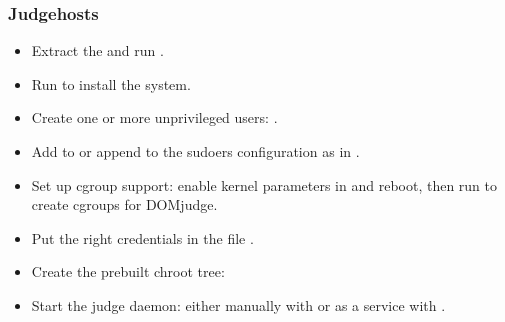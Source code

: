 \documentclass[a4paper,10pt,english,openany]{sphinxmanual}
\begin{document}
\subsubsection{Judgehosts}
\label{\detokenize{quick-install:judgehosts}}\begin{itemize}
\item {} 
\sphinxAtStartPar
Extract the  and run
.

\item {} 
\sphinxAtStartPar
Run  to install the system.

\item {} 
\sphinxAtStartPar
Create one or more unprivileged users:
.

\item {} 
\sphinxAtStartPar
Add to  or append to  the
sudoers configuration as in .

\item {} 
\sphinxAtStartPar
Set up cgroup support: enable kernel parameters in
 and reboot, then run
 to create cgroups for DOMjudge.

\item {} 
\sphinxAtStartPar
Put the right credentials in the file .

\item {} 
\sphinxAtStartPar
Create the pre\sphinxhyphen{}built chroot tree: 

\item {} 
\sphinxAtStartPar
Start the judge daemon: either manually with 
or as a service with .

\end{itemize}
\end{document}
